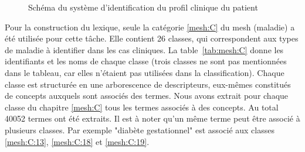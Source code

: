 \begin{figure}[htb]
    \small
    \centering
    \caption{Schéma du système d'identification du profil clinique du patient}
    \label{fig:class:sys-sch}
\end{figure}

Pour la construction du lexique, seule la catégorie \ref{mesh:C} du \gls{mesh} (maladie) a été utilisée pour cette tâche.
Elle contient \num{26} classes, qui correspondent aux types de maladie à identifier dans les cas cliniques.
La table~\ref{tab:mesh:C} donne les identifiants et les noms de chaque classe (trois classes ne sont pas mentionnées dans le tableau, car elles n'étaient pas utilisées dans la classification).
Chaque classe est structurée en une arborescence de descripteurs, eux-mêmes constitués de concepts auxquels sont associés des termes.
Nous avons extrait pour chaque classe du chapitre \ref{mesh:C} tous les termes associés à des concepts.
Au total \num{40052} termes ont été extraits.
Il est à noter qu'un même terme peut être associé à plusieurs classes.
Par exemple "diabète gestationnel" est associé aux classes \ref{mesh:C:13}, \ref{mesh:C:18} et \ref{mesh:C:19}.

